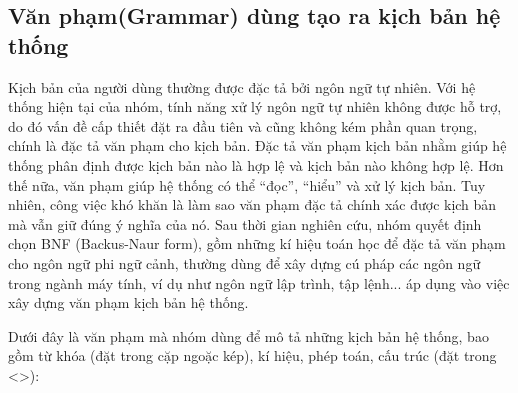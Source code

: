 \documentclass[11pt,a4paper,oneside]{book}
\begin{document}
\subsection{Văn phạm(Grammar) dùng tạo ra kịch bản hệ thống}

Kịch bản của người dùng thường được đặc tả bởi ngôn ngữ tự nhiên. Với hệ thống hiện tại của nhóm, tính năng xử lý ngôn ngữ tự nhiên không được hỗ trợ, do đó vấn đề cấp thiết đặt ra đầu tiên và cũng không kém phần quan trọng, chính là đặc tả văn phạm cho kịch bản. Đặc tả văn phạm kịch bản nhằm giúp hệ thống phân định được kịch bản nào là hợp lệ và kịch bản nào không hợp lệ. Hơn thế nữa, văn phạm giúp hệ thống có thể “đọc”, “hiểu” và xử lý kịch bản. Tuy nhiên, công việc khó khăn là làm sao văn phạm đặc tả chính xác được kịch bản mà vẫn giữ đúng ý nghĩa của nó. Sau thời gian nghiên cứu, nhóm quyết định chọn BNF (Backus-Naur form), gồm những kí hiệu toán học để đặc tả văn phạm cho ngôn ngữ phi ngữ cảnh, thường dùng để xây dựng cú pháp các ngôn ngữ trong ngành máy tính, ví dụ như ngôn ngữ lập trình, tập lệnh... áp dụng vào việc xây dựng văn phạm kịch bản hệ thống.

Dưới đây là văn phạm mà nhóm dùng để mô tả những kịch bản hệ thống, bao gồm từ khóa (đặt trong cặp ngoặc kép), kí hiệu, phép toán, cấu trúc (đặt trong <>):
\end{document}
